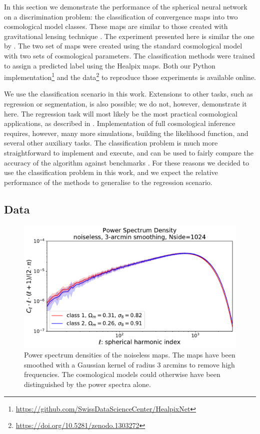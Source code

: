 \documentclass[final,twocolumn,3p,times,authoryear]{elsarticle}
\newcommand{\1}{\b{1}}              %
\newcommand{\0}{\b{0}}              %
\begin{document}
In this section we demonstrate the performance of the spherical neural network on a discrimination problem: the classification of convergence maps into two cosmological model classes.
These maps are similar to those created with gravitational lensing technique \citep{chang2017curvedsky}.
The experiment presented here is similar the one by \citet{schmelze2017cosmologicalmodel}.
The two set of maps were created using the standard cosmological model with two sets of cosmological parameters.
The classification methods were trained to assign a predicted label using the Healpix maps.
Both our Python implementation\footnote{\url{https://github.com/SwissDataScienceCenter/HealpixNet}} and the data\footnote{\url{https://doi.org/10.5281/zenodo.1303272}} to reproduce those experiments is available online.

We use the classification scenario in this work.
Extensions to other tasks, such as regression or segmentation, is also possible; we do not, however, demonstrate it here.
The regression task will most likely be the most practical cosmological applications, as described in \citep{gupta2018nongaussianinformation,fluri2018deep}.
Implementation of full cosmological inference requires, however, many more simulations, building the likelihood function, and several other auxiliary tasks.
The classification problem is much more straightforward to implement and execute, and can be used to fairly compare the accuracy of the algorithm against benchmarks \citep{schmelze2017cosmologicalmodel}.
For these reasons we decided to use the classification problem in this work, and we expect the relative performance of the methods to generalise to the regression scenario.


\subsection{Data}
\label{sec:data}

\begin{figure}
\centering
\includegraphics[width=\linewidth]{psd_sigma3}
\caption{Power spectrum densities of the noiseless maps.
The maps have been smoothed with a Gaussian kernel of radius $3$ arcmins to remove high frequencies.
The cosmological models could otherwise have been distinguished by the power spectra alone.}
\label{fig:psd_sigma3}
\end{figure}
\end{document}
